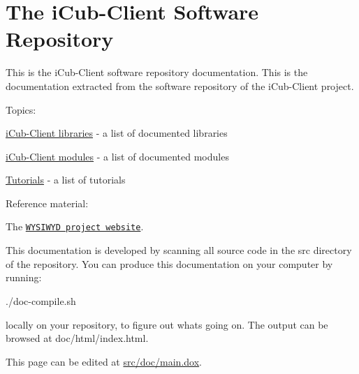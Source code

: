  \hypertarget{index_icubclient_software_documentation}{}\section{The i\+Cub-\/\+Client Software Repository}\label{index_icubclient_software_documentation}
This is the i\+Cub-\/\+Client software repository documentation. This is the documentation extracted from the software repository of the i\+Cub-\/\+Client project.

Topics\+:


\begin{DoxyItemize}
\item \hyperlink{group__icubclient__libraries}{i\+Cub-\/\+Client libraries} -\/ a list of documented libraries
\item \hyperlink{group__icubclient__modules}{i\+Cub-\/\+Client modules} -\/ a list of documented modules
\item \hyperlink{group__icubclient__tutorials}{Tutorials} -\/ a list of tutorials
\item Reference material\+:
\begin{DoxyItemize}
\item The \href{http://wysiwyd.upf.edu}{\tt W\+Y\+S\+I\+W\+YD project website}.
\end{DoxyItemize}
\end{DoxyItemize}

This documentation is developed by scanning all source code in the src directory of the repository. You can produce this documentation on your computer by running\+:

\begin{DoxyVerb}  ./doc-compile.sh
\end{DoxyVerb}


locally on your repository, to figure out what\textquotesingle{}s going on. The output can be browsed at doc/html/index.\+html.

This page can be edited at \hyperlink{main_8dox}{src/doc/main.\+dox}. 